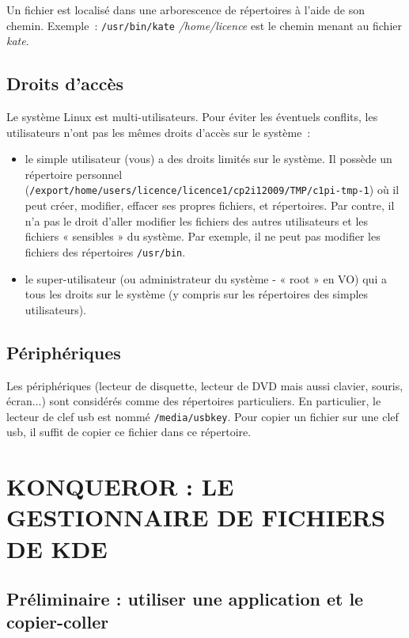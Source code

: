 \documentclass[12pt,a4paper]{article}
\begin{document}
Un fichier est localisé dans
une arborescence de répertoires à l'aide de son chemin. Exemple~: 
{\tt /usr/bin/kate} \emph{/home/licence} est le chemin menant au fichier
\emph{kate}. 



\subsection{Droits d'accès}
Le système Linux est multi-utilisateurs. Pour éviter les éventuels
conflits, les utilisateurs n'ont pas les mêmes droits d'accès sur
le système~:

\begin{itemize}
\item le simple utilisateur (vous) a des droits limités sur le
  système. Il possède un répertoire personnel
  ({\tt /export/home/users/licence/licence1/cp2i12009/TMP/c1pi-tmp-1})
  où il
  peut créer, modifier, effacer ses propres fichiers, et
  répertoires. Par contre, il n'a pas le droit d'aller modifier les
  fichiers des autres utilisateurs et les fichiers « sensibles » du
  système. Par exemple, il ne peut pas modifier les fichiers des
  répertoires {\tt /usr/bin}.  

\item le super-utilisateur (ou administrateur du système - « root » en
  VO) qui a tous les droits sur le système (y compris sur les
  répertoires des simples utilisateurs).
\end{itemize}



\subsection{Périphériques}
    Les périphériques (lecteur de disquette, lecteur de DVD mais aussi
    clavier, souris, écran...) sont considérés comme des répertoires
    particuliers. En particulier, le lecteur de clef usb est nommé
    {\tt /media/usbkey}. Pour copier un fichier sur une clef usb, il
    suffit de copier ce fichier dans ce répertoire.


\section{KONQUEROR : LE GESTIONNAIRE DE FICHIERS DE KDE}
\subsection{Préliminaire : utiliser une application et le copier-coller}
\end{document}
